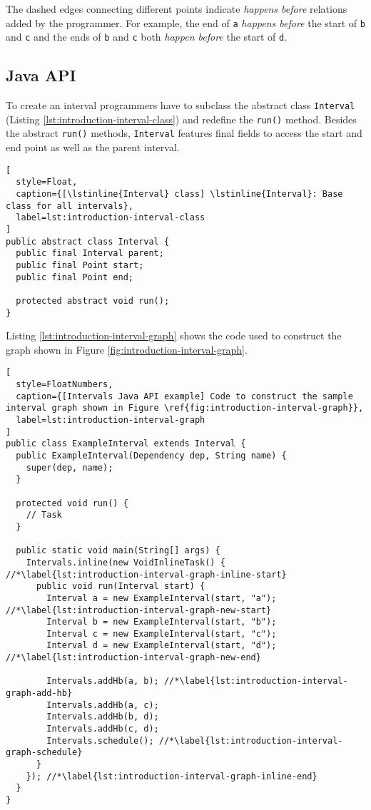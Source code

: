 The dashed edges connecting different points indicate \emph{happens
  before} relations added by the programmer. For example, the end of
\lstinline!a! \emph{happens before} the start of \lstinline!b! and
\lstinline!c! and the ends of \lstinline!b! and \lstinline!c! both
\emph{happen before} the start of \lstinline!d!.

\subsection{Java API}
\label{sec:intro-intervals-java-api}

To create an interval programmers have to subclass the abstract class
\lstinline!Interval! (Listing \ref{lst:introduction-interval-class})
and redefine the \lstinline!run()! method. Besides the abstract
\lstinline!run()! methods, \lstinline!Interval! features final fields
to access the start and end point as well as the parent interval.

\begin{lstlisting}[
  style=Float, 
  caption={[\lstinline{Interval} class] \lstinline{Interval}: Base class for all intervals},
  label=lst:introduction-interval-class
]
public abstract class Interval {
  public final Interval parent;
  public final Point start;
  public final Point end;

  protected abstract void run();
}
\end{lstlisting}

Listing \ref{lst:introduction-interval-graph} shows the code used to construct the
graph shown in Figure \ref{fig:introduction-interval-graph}.

\begin{lstlisting}[
  style=FloatNumbers, 
  caption={[Intervals Java API example] Code to construct the sample interval graph shown in Figure \ref{fig:introduction-interval-graph}},
  label=lst:introduction-interval-graph
]
public class ExampleInterval extends Interval {
  public ExampleInterval(Dependency dep, String name) {
    super(dep, name);
  }
  
  protected void run() {
    // Task
  }
  
  public static void main(String[] args) {
    Intervals.inline(new VoidInlineTask() { //*\label{lst:introduction-interval-graph-inline-start}
      public void run(Interval start) {
        Interval a = new ExampleInterval(start, "a"); //*\label{lst:introduction-interval-graph-new-start}
        Interval b = new ExampleInterval(start, "b");
        Interval c = new ExampleInterval(start, "c");
        Interval d = new ExampleInterval(start, "d"); //*\label{lst:introduction-interval-graph-new-end}
        
        Intervals.addHb(a, b); //*\label{lst:introduction-interval-graph-add-hb}
        Intervals.addHb(a, c);
        Intervals.addHb(b, d);
        Intervals.addHb(c, d);
        Intervals.schedule(); //*\label{lst:introduction-interval-graph-schedule}
      }
    }); //*\label{lst:introduction-interval-graph-inline-end}
  }
}
\end{lstlisting}

